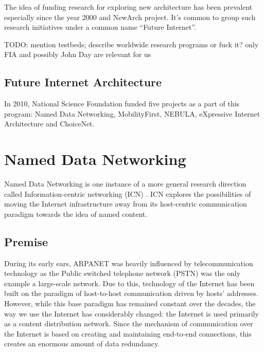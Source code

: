         The idea of funding research for exploring new architecture has been prevalent especially since the year 2000 and NewArch project. It's common to group such research initiatives under a common name ``Future Internet''.

        TODO: mention testbeds; describe worldwide research programs or fuck it? only FIA and possibly John Day are relevant for us

        \subsection{Future Internet Architecture}
            In 2010, National Science Foundation funded five projects as a part of this program: Named Data Networking, MobilityFirst, NEBULA, eXpressive Internet Architecture and ChoiceNet.


    \section{Named Data Networking}\label{archs:ndn}

        Named Data Networking is one instance of a more general research direction called Information-centric networking (ICN) \cite{icn}. ICN explores the possibilities of moving the Internet infrastructure away from its host-centric communication paradigm towards the idea of named content.

        \subsection{Premise}

            During its early ears, ARPANET was heavily influenced by telecommunication technology as the Public switched telephone network (PSTN) was the only example a large-scale network. Due to this, technology of the Internet has been built on the paradigm of host-to-host communication driven by hosts' addresses. However, while this base paradigm has remained constant over the decades, the way we use the Internet has considerably changed: the Internet is used primarily as a content distribution network. Since the mechanism of communication over the Internet is based on creating and maintaining end-to-end connections, this creates an enormous amount of data redundancy.

